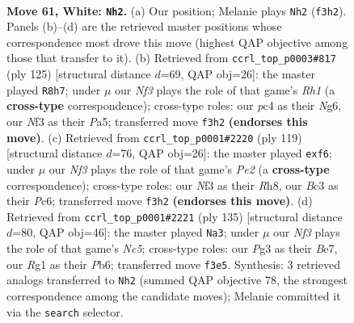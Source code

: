 \documentclass[11pt]{article}
\begin{document}
\clearpage

\begin{figure}[p]\centering
\begin{subfigure}{0.46\textwidth}\centering
\resizebox{\linewidth}{!}{%
\newchessgame
\chessboard[
  setfen={3krb2/6p1/p1p4r/Pp1b1p1p/2p2P1P/2B1PNP1/1P2K3/1R4R1 w - - 23 61},
  showmover=false,
  pgfstyle=straightmove, color=movearrow, markmove={f3-h2}
]}
\caption{}
\end{subfigure}\hfill
\begin{subfigure}{0.46\textwidth}\centering
\resizebox{\linewidth}{!}{%
\newchessgame
\chessboard[
  setfen={7r/1k1b4/1p1p2n1/p1p4r/P1P1Pp1p/1PB2P2/4K1PR/5B1R b - - 13 63},
  showmover=false,
  pgfstyle=straightmove, color=movearrow, markmove={h8-h7}
]}
\caption{}
\end{subfigure}
\\[4pt]
\begin{subfigure}{0.46\textwidth}\centering
\resizebox{\linewidth}{!}{%
\newchessgame
\chessboard[
  setfen={7r/1pk1p2r/p1p2Bb1/2Pp4/KP1PpP1P/4P3/1P4R1/7R b - - 0 60},
  showmover=false,
  pgfstyle=straightmove, color=movearrow, markmove={e7-f6}
]}
\caption{}
\end{subfigure}\hfill
\begin{subfigure}{0.46\textwidth}\centering
\resizebox{\linewidth}{!}{%
\newchessgame
\chessboard[
  setfen={3r4/p3bkp1/Ppr1p1p1/5pP1/2nP1P1P/2PB4/4R1K1/R3B3 b - - 50 68},
  showmover=false,
  pgfstyle=straightmove, color=movearrow, markmove={c4-a3}
]}
\caption{}
\end{subfigure}
\caption{\textbf{Move 61, White: \texttt{Nh2}.} (a) Our position; Melanie plays \texttt{Nh2} (\texttt{f3h2}). Panels (b)--(d) are the retrieved master positions whose correspondence most drove this move (highest QAP objective among those that transfer to it). (b) Retrieved from \texttt{ccrl\_top\_p0003\#817} (ply 125) [structural distance $d$=69, QAP obj=26]: the master played \texttt{R8h7}; under $\mu$ our \emph{Nf3} plays the role of that game's \emph{Rh1} (a \textbf{cross-type} correspondence); cross-type roles: our \emph{p}c4 as their \emph{N}g6, our \emph{N}f3 as their \emph{P}a5; transferred move \texttt{f3h2} \textbf{(endorses this move)}. (c) Retrieved from \texttt{ccrl\_top\_p0001\#2220} (ply 119) [structural distance $d$=76, QAP obj=26]: the master played \texttt{exf6}; under $\mu$ our \emph{Nf3} plays the role of that game's \emph{Pe2} (a \textbf{cross-type} correspondence); cross-type roles: our \emph{N}f3 as their \emph{R}h8, our \emph{B}c3 as their \emph{P}c6; transferred move \texttt{f3h2} \textbf{(endorses this move)}. (d) Retrieved from \texttt{ccrl\_top\_p0001\#2221} (ply 135) [structural distance $d$=80, QAP obj=46]: the master played \texttt{Na3}; under $\mu$ our \emph{Nf3} plays the role of that game's \emph{Nc5}; cross-type roles: our \emph{P}g3 as their \emph{B}e7, our \emph{R}g1 as their \emph{P}b6; transferred move \texttt{f3e5}. Synthesis: 3 retrieved analogs transferred to \texttt{Nh2} (summed QAP objective 78, the strongest correspondence among the candidate moves); Melanie committed it via the \texttt{search} selector.}
\label{fig:thought-m120}
\end{figure}
\end{document}
